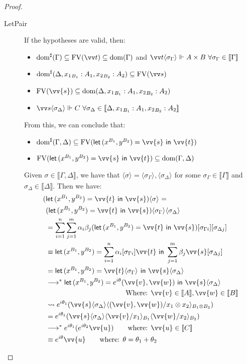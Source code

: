 \documentclass[runningheads,orivec,envcountsame,envcountsect]{llncs}
\newcommand\lra{\longrightarrow}
\newcommand\ansubst[2]{\ensuremath{\langle #1 \rangle_{#2}}}
\newcommand\dom[1]{\mathrm{dom}(#1)}
\newcommand\sdom[1]{\mathrm{dom}^{\sharp}(#1)}
\newcommand\FV[1]{\mathrm{FV}(#1)}
\def\Pair#1#2{(#1,#2)} %
\def\letkeyword{\mathsf{let}}
\def\inkeyword{\mathsf{in}}
\def\LetP#1#2#3#4#5#6{\letkeyword\,\Pair{#1^{#2}}{#3^{#4}}=#5~\inkeyword~#6}
\def\lraneq{\rightsquigarrow}
\def\eval{\lra^*}
\def\sem#1{\llbracket#1\rrbracket}
\begin{document}
\begin{proof}
\begin{description}
    \item[LetPair] If the hypotheses are valid, then:
    \begin{itemize}
        \item $\sdom{\Gamma}\subseteq \FV{\vv t} \subseteq \dom{\Gamma}$ and $\vv t \ansubst{\sigma_\Gamma}{}\Vdash A\times B\ \forall \sigma_\Gamma\in\sem\Gamma$
        \item $\sdom{\Delta, {x_1}_{B_1}:A_1, {x_2}_{B_2}:A_2}\subseteq\FV{\vv s}$
        \item $\FV{\vv{s}}\subseteq \dom{\Delta,{x_1}_{B_1}:A_1, {x_2}_{B_2}:A_2}$
        \item $\vv s \ansubst{\sigma_\Delta}{}\Vdash C\ \forall \sigma_\Delta\in\sem{\Delta, {x_1}_{B_1}:A_1, {x_2}_{B_2}:A_2}$
    \end{itemize}
    From this, we can conclude that:
    \begin{itemize}
        \item $\sdom{\Gamma,\Delta}\subseteq\FV{\LetP{x}{B_1}{y}{B_2}{\vv{s}}{\vv{t}}}$
        \item $\FV{\LetP{x}{B_1}{y}{B_2}{\vv{s}}{\vv{t}}}\subseteq\dom{\Gamma,\Delta}$
    \end{itemize}
    
    Given $\sigma\in\sem{\Gamma,\Delta}$, we have that $\ansubst{\sigma}{}=\ansubst{\sigma_\Gamma}{},\ansubst{\sigma_\Delta}{}$ for some $\sigma_\Gamma\in\sem\Gamma$ and $\sigma_\Delta\in\sem\Delta$. Then we have:
    \begin{align*}
        (&\LetP{x}{B_1}{y}{B_2}{\vv{t}}{\vv{s}})\ansubst{\sigma}{} = \\
        &(\LetP{x}{B_1}{y}{B_2}{\vv{t}}{\vv{s}})\ansubst{\sigma_\Gamma}{}\ansubst{\sigma_\Delta}{}\\
        &= \sum_{i=1}^{n}\sum_{j=1}^{m}\alpha_i\beta_j(\LetP{x}{B_1}{y}{B_2}{\vv{t}}{\vv{s}})[\sigma_{\Gamma i}][\sigma_{\Delta j}]\\
        &\equiv \LetP{x}{B_1}{y}{B_2}{\sum_{i=1}^{n}\alpha_i[\sigma_{\Gamma i}]\vv{t}}{\sum_{j=1}^{m}\beta_j \vv{s}[\sigma_{\Delta j}]}\\
        &= \LetP{x}{B_1}{y}{B_2}{\vv{t}\ansubst{\sigma_\Gamma}{}}{\vv{s}\ansubst{\sigma_\Delta}{}}\\
        &\eval \LetP{x}{B_1}{y}{B_2}{e^{i\theta} \Pair{\vv{v}}{\vv{w}}}{\vv{s}\ansubst{\sigma_\Delta}{}}\\
        &\hspace*{4cm}{\text{Where: }}\vv{v}\in\sem{A},\vv{w}\in\sem{B}\\
        &\lraneq e^{i\theta_1} (\vv{s}\ansubst{\sigma_\Delta}{}\ansubst{\Pair{\vv{v}}{\vv{w}}/x_1\otimes x_2}{B_1\otimes B_2})\\
        &= e^{i\theta_1} (\vv{s}\ansubst{\sigma_\Delta}{}\ansubst{\vv{v}/x_1}{B_1}\ansubst{\vv{w}/x_2}{B_2})\\
        &\eval e^{i\theta_1}  (e^{i\theta_2}  \vv{u})\qquad\text{where: }\vv{u}\in\sem{C}\\
        &\equiv e^{i\theta}  \vv{u}\qquad\text{where: }\theta=\theta_1 + \theta_2
    \end{align*}
    

\end{description}
\end{proof}
\end{document}
